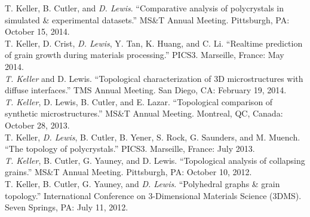 \documentclass[margin]{res}
\begin{document}
\begin{resume}
T. Keller, B. Cutler, and \emph{D. Lewis}. ``Comparative analysis of polycrystals in simulated \& experimental datasets.''
 MS\&T Annual Meeting. Pittsburgh, PA: October 15, 2014.\\[0.25\baselineskip]
T. Keller, D. Crist, \emph{D. Lewis}, Y. Tan, K. Huang, and C. Li. ``Realtime prediction of grain growth during materials processing.''
 PICS3. Marseille, France: May 2014.\\[0.25\baselineskip]
\emph{T. Keller} and D. Lewis. ``Topological characterization of 3D microstructures with diffuse interfaces.'' TMS Annual Meeting. San Diego, CA: February 19, 2014.\\[0.25\baselineskip]
\baselineskip
\emph{T. Keller}, D. Lewis, B. Cutler, and E. Lazar. ``Topological comparison of synthetic microstructures.''
 MS\&T Annual Meeting. Montreal, QC, Canada: October 28, 2013.\\[0.25\baselineskip]
T. Keller, \emph{D. Lewis}, B. Cutler, B. Yener, S. Rock, G. Saunders, and M. Muench. ``The topology of polycrystals.''
 PICS3. Marseille, France: July 2013.\\[0.25\baselineskip]
\baselineskip
\emph{T. Keller}, B. Cutler, G. Yauney, and D. Lewis. ``Topological analysis of collapsing grains.''
 MS\&T Annual Meeting. Pittsburgh, PA: October 10, 2012.\\[0.25\baselineskip]
T. Keller, B. Cutler, G. Yauney, and \emph{D. Lewis}. ``Polyhedral graphs \& grain topology.''
 International Conference on 3-Dimensional Materials Science (3DMS). Seven Springs, PA: July 11, 2012.\\[0.25\baselineskip]
\baselineskip


\end{resume}
\end{document}
